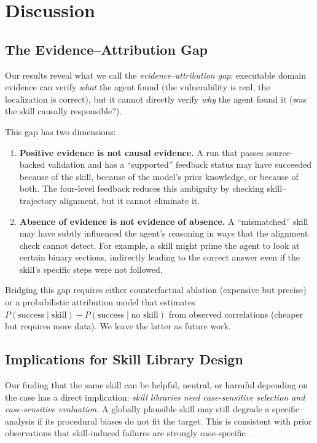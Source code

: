 ﻿\documentclass[preprint,12pt]{elsarticle}
\begin{document}
\section{Discussion}
\label{sec:discussion}

\subsection{The Evidence--Attribution Gap}

Our results reveal what we call the \emph{evidence--attribution gap}:
executable domain evidence can verify \emph{what} the agent found (the
vulnerability is real, the localization is correct), but it cannot
directly verify \emph{why} the agent found it (was the skill causally
responsible?).

This gap has two dimensions:
\begin{enumerate}[leftmargin=*]
    \item \textbf{Positive evidence is not causal evidence.} A run that
    passes source-backed validation and has a ``supported'' feedback status
    may have succeeded because of the skill, because of the model's prior
    knowledge, or because of both.  The four-level feedback reduces this
    ambiguity by checking skill--trajectory alignment, but it cannot
    eliminate it.
    \item \textbf{Absence of evidence is not evidence of absence.} A
    ``mismatched'' skill may have subtly influenced the agent's reasoning
    in ways that the alignment check cannot detect.  For example, a skill
    might prime the agent to look at certain binary sections, indirectly
    leading to the correct answer even if the skill's specific steps were
    not followed.
\end{enumerate}

Bridging this gap requires either counterfactual ablation (expensive but
precise) or a probabilistic attribution model that estimates $P(\text{success}
\mid \text{skill}) - P(\text{success} \mid \text{no skill})$ from observed
correlations (cheaper but requires more data).  We leave the latter as
future work.

\subsection{Implications for Skill Library Design}

Our finding that the same skill can be helpful, neutral, or harmful
depending on the case has a direct implication: \emph{skill libraries need
case-sensitive selection and case-sensitive evaluation.}  A globally
plausible skill may still degrade a specific analysis if its procedural
biases do not fit the target.  This is consistent with
prior observations that skill-induced failures are strongly
case-specific~\cite{skillharmful}.
\end{document}
